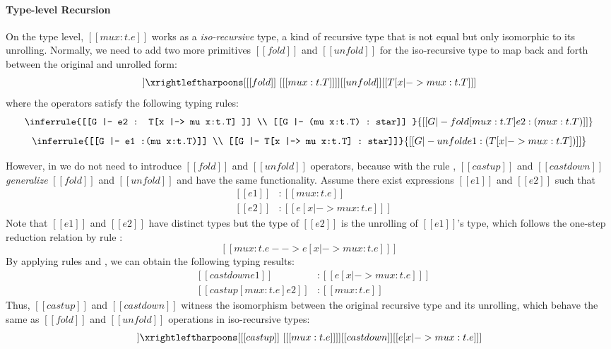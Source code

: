 \paragraph{Type-level Recursion}

On the type level, $[[mu x:t.e]]$ works as a \emph{iso-recursive}
type, a kind of recursive type that is not equal but only isomorphic
to its unrolling. Normally, we need to add two more primitives
$[[fold]]$ and $[[unfold]]$ for the iso-recursive type to map back
and forth between the original and unrolled form:
\begin{align*}
  [[mu x:t.T]] \xrightleftharpoons[{[[fold]]~[ [[mu x:t.T]] ]}]{[[unfold]]} [[T[x |-> mu x:t.T] ]]
\end{align*}
where the operators satisfy the following typing rules:
\[ \inferrule{[[G |- e2 : T[x |-> mu x:t.T] ]] \\ [[G |- (mu x:t.T) : star]] }
   {[[G |- fold [mu x:t.T] e2 : (mu x:t.T) ]]} \]
\[ \inferrule{[[G |- e1 :(mu x:t.T)]] \\ [[G |- T[x |-> mu x:t.T] : star]]}
   {[[G |- unfold e1 : (T[x |-> mu x:t.T]) ]]} \]

However, in \name we do not need to introduce $[[fold]]$ and
$[[unfold]]$ operators, because with the rule ,
$[[castup]]$ and $[[castdown]]$ \emph{generalize} $[[fold]]$ and
$[[unfold]]$ and have the same functionality. Assume there exist
expressions $[[e1]]$ and $[[e2]]$ such that
\[\begin{array}{lll}
	&[[e1]] &: [[mu x:t.e]]\\
	&[[e2]] &: [[e [x |-> mu x:t.e] ]]
\end{array}\]
Note that $[[e1]]$ and $[[e2]]$ have distinct types but the type of $[[e2]]$ is
the unrolling of $[[e1]]$'s type, which follows the one-step reduction relation
by rule :
\[ [[mu x:t.e --> e [x |-> mu x:t.e] ]] \]
By applying rules  and , we can obtain
the following typing results:
\[\begin{array}{lll}
	&[[castdown e1]] &: [[e [x |-> mu x:t.e] ]]\\
	&[[castup [mu x:t.e] e2]] &: [[mu x:t.e]]
\end{array}\]
Thus, $[[castup]]$ and $[[castdown]]$ witness the isomorphism between the
original recursive type and its unrolling, which behave the same as $[[fold]]$
and $[[unfold]]$ operations in iso-recursive types:
\begin{align*}
  [[mu x:t.e]] \xrightleftharpoons[{[[castup]]~[ [[mu x:t.e]]
  ]}]{[[castdown]]} [[e[x |-> mu x:t.e] ]]
\end{align*}


